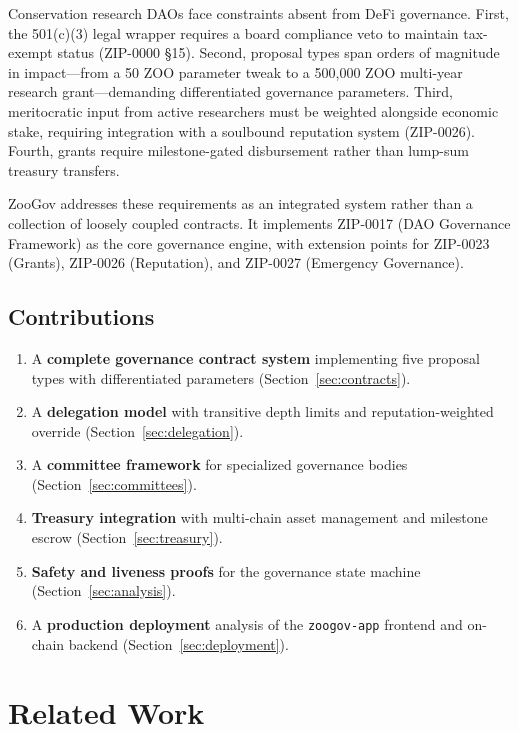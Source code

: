 \documentclass[11pt,letterpaper]{article}
\begin{document}
Conservation research DAOs face constraints absent from DeFi governance. First, the 501(c)(3) legal wrapper requires a board compliance veto to maintain tax-exempt status (ZIP-0000 \S15). Second, proposal types span orders of magnitude in impact---from a 50 ZOO parameter tweak to a 500{,}000 ZOO multi-year research grant---demanding differentiated governance parameters. Third, meritocratic input from active researchers must be weighted alongside economic stake, requiring integration with a soulbound reputation system (ZIP-0026). Fourth, grants require milestone-gated disbursement rather than lump-sum treasury transfers.

ZooGov addresses these requirements as an integrated system rather than a collection of loosely coupled contracts. It implements ZIP-0017 (DAO Governance Framework) as the core governance engine, with extension points for ZIP-0023 (Grants), ZIP-0026 (Reputation), and ZIP-0027 (Emergency Governance).

\subsection{Contributions}

\begin{enumerate}
    \item A \textbf{complete governance contract system} implementing five proposal types with differentiated parameters (Section~\ref{sec:contracts}).
    \item A \textbf{delegation model} with transitive depth limits and reputation-weighted override (Section~\ref{sec:delegation}).
    \item A \textbf{committee framework} for specialized governance bodies (Section~\ref{sec:committees}).
    \item \textbf{Treasury integration} with multi-chain asset management and milestone escrow (Section~\ref{sec:treasury}).
    \item \textbf{Safety and liveness proofs} for the governance state machine (Section~\ref{sec:analysis}).
    \item A \textbf{production deployment} analysis of the \texttt{zoogov-app} frontend and on-chain backend (Section~\ref{sec:deployment}).
\end{enumerate}

\section{Related Work}
\label{sec:related}
\end{document}
